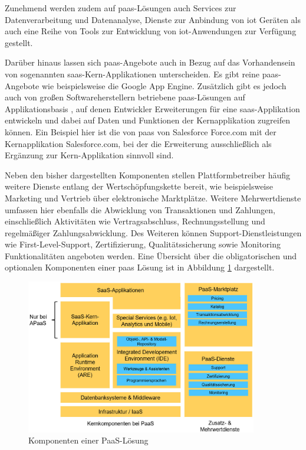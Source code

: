 Zunehmend werden zudem auf \ac{paas}-Lösungen auch Services zur Datenverarbeitung und Datenanalyse, Dienste zur Anbindung von \ac{iot} Geräten als auch eine Reihe von Tools zur Entwicklung von \ac{iot}-Anwendungen zur Verfügung gestellt. \autocite[Vgl.][]{IBM2023}

Darüber hinaus lassen sich \ac{paas}-Angebote auch in Bezug auf das Vorhandensein von sogenannten \ac{saas}-Kern-Applikationen unterscheiden. Es gibt reine \ac{paas}-Angebote wie beispielsweise die Google App Engine. Zusätzlich gibt es jedoch auch von großen Softwareherstellern betriebene \ac{paas}-Lösungen auf Applikationsbasis , auf denen Entwickler Erweiterungen für eine \ac{saas}-Applikation entwickeln und dabei auf Daten und Funktionen der Kernapplikation zugreifen können. Ein Beispiel hier ist die von \ac{paas} von Salesforce Force.com mit der Kernapplikation Salesforce.com, bei der die Erweiterung ausschließlich als Ergänzung zur Kern-Applikation sinnvoll sind. \autocite[Vgl.][S. 371]{BEIMBORN2011} 

\newpage

Neben den bisher dargestellten Komponenten stellen Plattformbetreiber häufig weitere Dienste entlang der Wertschöpfungskette bereit, wie beispielsweise Marketing und Vertrieb über elektronische Marktplätze. Weitere Mehrwertdienste umfassen hier ebenfalls die Abwicklung von Transaktionen und Zahlungen, einschließlich Aktivitäten wie Vertragsabschluss, Rechnungsstellung und regelmäßiger Zahlungsabwicklung. Des Weiteren können Support-Dienstleistungen wie First-Level-Support, Zertifizierung, Qualitätssicherung sowie Monitoring Funktionalitäten angeboten werden. \autocite[Vgl.][S. 598]{HAHN2016} Eine Übersicht über die obligatorischen und optionalen Komponenten einer \ac{paas} Lösung ist in Abbildung \ref{fig:PaaSK} dargestellt.


\begin{figure}[h]
    \centering
    \includegraphics[width=0.9\textwidth]{img/PaaS_Komponenten.jpg}
    \caption[Komponenten einer PaaS-Lösung]{Komponenten einer PaaS-Lösung\autocite{PaaSK}}
    \label{fig:PaaSK}
\end{figure}


